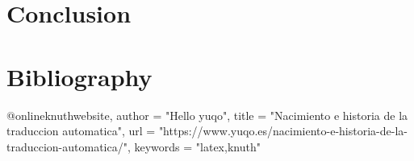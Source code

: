 \documentclass[a4paper]{article}
\theoremstyle{plain}
\theoremstyle{definition}
\begin{document}
	\section{Conclusion}
	\label{sec:examples}	
	
	
	
	
    \usepackage{biblatex}
    \section{Bibliography}
    @online{knuthwebsite,
    author    = "Hello yuqo",
    title     = "Nacimiento e historia de la traduccion automatica",
    url       = "https://www.yuqo.es/nacimiento-e-historia-de-la-traduccion-automatica/",
    keywords  = "latex,knuth"
}
	
\end{document}
